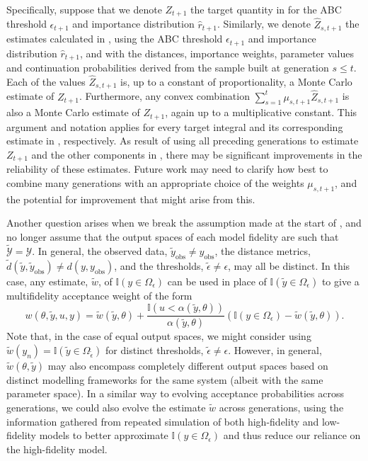 \documentclass[12pt, onecolumn]{article}
\newcommand{\obs}[1]{#1_{\mathrm{obs}}}
\begin{document}
Specifically, suppose that we denote $Z_{t+1}$ the target quantity in  for the ABC threshold $\epsilon_{t+1}$ and importance distribution $\hat r_{t+1}$.
Similarly, we denote $\hat Z_{s, t+1}$ the estimates calculated in , using the ABC threshold $\epsilon_{t+1}$ and importance distribution $\hat r_{t+1}$, and with the distances, importance weights, parameter values and continuation probabilities derived from the sample built at generation $s \leq t$.
Each of the values $\hat Z_{s, t+1}$ is, up to a constant of proportionality, a Monte Carlo estimate of $Z_{t+1}$.
Furthermore, any convex combination $\sum_{s=1}^{t} \mu_{s, t+1} \hat Z_{s, t+1}$ is also a Monte Carlo estimate of $Z_{t+1}$, again up to a multiplicative constant.
This argument and notation applies for every target integral and its corresponding estimate in , respectively.
As result of using all preceding generations to estimate $Z_{t+1}$ and the other components in , there may be significant improvements in the reliability of these estimates.
Future work may need to clarify how best to combine many generations with an appropriate choice of the weights $\mu_{s,t+1}$, and the potential for improvement that might arise from this.


Another question arises when we break the assumption made at the start of , and no longer assume that the output spaces of each model fidelity are such that $\tilde{\mathcal Y} = \mathcal Y$.
In general, the observed data, $\obs{\tilde y} \neq \obs y$, the distance metrics, $\tilde d(\tilde y, \obs{\tilde y}) \neq d(y,\obs y)$, and the thresholds, $\tilde \epsilon \neq \epsilon$, may all be distinct.
In this case, any estimate, $\tilde w$, of $\mathbb I(y \in \Omega_\epsilon)$ can be used in place of $\mathbb I(\tilde y \in \Omega_\epsilon)$ to give a multifidelity acceptance weight of the form
\[
 w(\theta, \tilde y, u, y) = \tilde w(\tilde y, \theta) + \frac{\mathbb I(u<\alpha(\tilde y, \theta))}{\alpha(\tilde y, \theta)} \left( \mathbb I(y \in \Omega_\epsilon) - \tilde w(\tilde y, \theta) \right).
\]
Note that, in the case of equal output spaces, we might consider using $\tilde w(y_n) = \mathbb I(\tilde y \in \Omega_{\tilde \epsilon})$ for distinct thresholds, $\tilde \epsilon \neq \epsilon$.
However, in general, $\tilde w(\theta, \tilde y)$ may also encompass completely different output spaces based on distinct modelling frameworks for the same system (albeit with the same parameter space).
In a similar way to evolving acceptance probabilities across generations, we could also evolve the estimate $\tilde w$ across generations, using the information gathered from repeated simulation of both high-fidelity and low-fidelity models to better approximate $\mathbb I(y \in \Omega_\epsilon)$ and thus reduce our reliance on the high-fidelity model.
\end{document}
